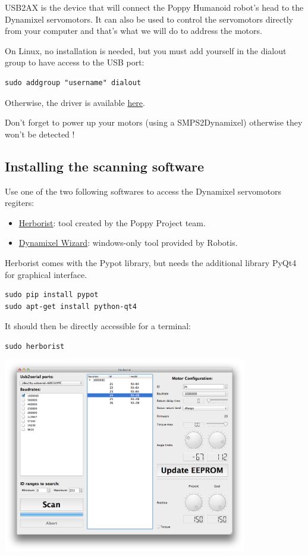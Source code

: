 \documentclass{article}
\begin{document}
USB2AX is the device that will connect the Poppy Humanoid robot's head to the Dynamixel servomotors. It can also be used to control the servomotors directly from your computer and that's what we will do to address the motors.

On Linux, no installation is needed, but you must add yourself in the dialout group to have access to the USB port:
 \begin{verbatim}
sudo addgroup "username" dialout
\end{verbatim}

Otherwise, the driver is available \href{http://www.xevelabs.com/doku.php?id=product:usb2ax:quickstart}{here}.

Don't forget to power up your motors (using a SMPS2Dynamixel) otherwise they won't be detected !

\subsection{Installing the scanning software}

Use one of the two following softwares to access the Dynamixel servomotors regiters:

\begin{itemize}
\item \href{http://poppy-project.github.io/pypot/herborist.html}{Herborist}: tool created by the Poppy Project team. 
\item \href{http://support.robotis.com/en/software/roboplus/dynamixel_monitor/quickstart/dynamixel\_monitor\_connection.htm}{Dynamixel Wizard}: windows-only tool provided by Robotis.
\end{itemize}

Herborist comes with the Pypot library, but needs the additional library PyQt4 for graphical interface.
\begin{verbatim}
sudo pip install pypot
sudo apt-get install python-qt4
\end{verbatim}

It should then be directly accessible for a terminal:
\begin{verbatim}
sudo herborist
\end{verbatim}
 \begin{center}
  \includegraphics[width=0.8\textwidth]{img/herborist}
 \end{center}
 
\end{document}
